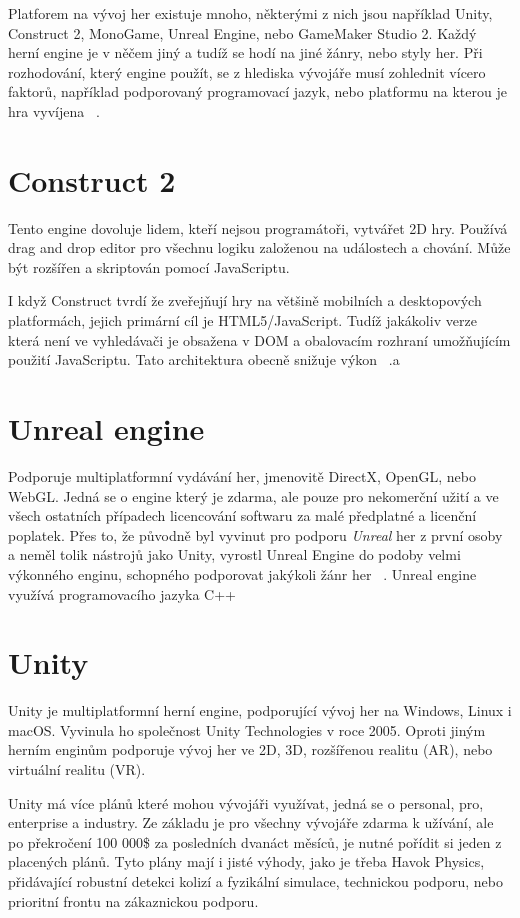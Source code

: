 Platforem na vývoj her existuje mnoho, některými z nich jsou například Unity, Construct 2, MonoGame, Unreal Engine, nebo GameMaker Studio 2. Každý herní engine je v něčem jiný a tudíž se hodí na jiné žánry, nebo styly her. Při rozhodování, který engine použít, se z hlediska vývojáře musí zohlednit vícero faktorů, například podporovaný programovací jazyk, nebo platformu na kterou je hra vyvíjena ~\cite{vohera2021game}.

\section{Construct 2}
Tento engine dovoluje lidem, kteří nejsou programátoři, vytvářet 2D hry. Používá drag and drop editor pro všechnu logiku založenou na událostech a chování. Může být rozšířen a skriptován pomocí JavaScriptu. 

I když Construct tvrdí že zveřejňují hry na většině mobilních a desktopových platformách, jejich primární cíl je HTML5/JavaScript. Tudíž jakákoliv verze která není ve vyhledávači je obsažena v DOM a obalovacím rozhraní umožňujícím použití JavaScriptu. Tato architektura obecně snižuje výkon ~\cite{engines}.a

\section{Unreal engine}
Podporuje multiplatformní vydávání her, jmenovitě DirectX, OpenGL, nebo WebGL. Jedná se o engine který je zdarma, ale pouze pro nekomerční užití a ve všech ostatních případech licencování softwaru za malé předplatné a licenční poplatek. Přes to, že původně byl vyvinut pro podporu \textit{Unreal} her z první osoby a neměl tolik nástrojů jako Unity, vyrostl Unreal Engine do podoby velmi výkonného enginu, schopného podporovat jakýkoli žánr her ~\cite{engines}. Unreal engine využívá programovacího jazyka C++

\section{Unity}
\label{unity}
Unity je multiplatformní herní engine, podporující vývoj her na Windows, Linux i macOS.
Vyvinula ho společnost Unity Technologies v roce 2005. Oproti jiným herním enginům podporuje vývoj her ve 2D, 3D, rozšířenou realitu (AR), nebo virtuální realitu (VR). 

Unity má více plánů které mohou vývojáři využívat, jedná se o personal, pro, enterprise a industry. Ze základu je pro všechny vývojáře zdarma k užívání, ale po překročení 100 000\$ za posledních dvanáct měsíců, je nutné pořídit si jeden z placených plánů. Tyto plány mají i jisté výhody, jako je třeba Havok Physics, přidávající robustní detekci kolizí a fyzikální simulace, technickou podporu, nebo prioritní frontu na zákaznickou podporu.~\cite{UnityPlans} 

